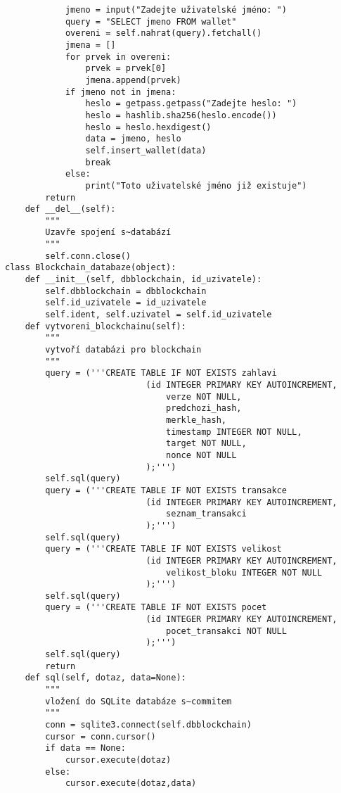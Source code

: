 \documentclass[12pt]{report}			%
\begin{document}
{\begin{appendices}
\begin{lstlisting}
            jmeno = input("Zadejte uživatelské jméno: ")
            query = "SELECT jmeno FROM wallet"
            overeni = self.nahrat(query).fetchall()
            jmena = []
            for prvek in overeni:
                prvek = prvek[0]
                jmena.append(prvek)
            if jmeno not in jmena:
                heslo = getpass.getpass("Zadejte heslo: ")
                heslo = hashlib.sha256(heslo.encode())
                heslo = heslo.hexdigest()
                data = jmeno, heslo
                self.insert_wallet(data)
                break
            else:
                print("Toto uživatelské jméno již existuje")
        return 
    def __del__(self):
        """
        Uzavře spojení s~databází
        """
        self.conn.close()
class Blockchain_databaze(object):
    def __init__(self, dbblockchain, id_uzivatele):
        self.dbblockchain = dbblockchain
        self.id_uzivatele = id_uzivatele
        self.ident, self.uzivatel = self.id_uzivatele
    def vytvoreni_blockchainu(self):
        """
        vytvoří databázi pro blockchain
        """
        query = ('''CREATE TABLE IF NOT EXISTS zahlavi
                            (id INTEGER PRIMARY KEY AUTOINCREMENT,
                                verze NOT NULL,
                                predchozi_hash,
                                merkle_hash,
                                timestamp INTEGER NOT NULL,
                                target NOT NULL,
                                nonce NOT NULL
                            );''')
        self.sql(query)
        query = ('''CREATE TABLE IF NOT EXISTS transakce
                            (id INTEGER PRIMARY KEY AUTOINCREMENT,
                                seznam_transakci
                            );''')
        self.sql(query)
        query = ('''CREATE TABLE IF NOT EXISTS velikost
                            (id INTEGER PRIMARY KEY AUTOINCREMENT,
                                velikost_bloku INTEGER NOT NULL
                            );''')
        self.sql(query)
        query = ('''CREATE TABLE IF NOT EXISTS pocet
                            (id INTEGER PRIMARY KEY AUTOINCREMENT,
                                pocet_transakci NOT NULL
                            );''')
        self.sql(query)
        return
    def sql(self, dotaz, data=None):
        """
        vložení do SQLite databáze s~commitem
        """
        conn = sqlite3.connect(self.dbblockchain)
        cursor = conn.cursor() 
        if data == None:
            cursor.execute(dotaz)
        else:
            cursor.execute(dotaz,data)

\end{lstlisting}
\end{appendices}}
\end{document}
